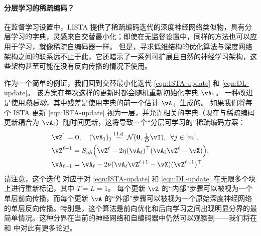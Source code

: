 \documentclass[../../book-main_zh.tex]{subfiles}
\begin{document}
\paragraph{分层学习的稀疏编码？}



在监督学习设置中，LISTA 提供了稀疏编码迭代的深度神经网络类似物，具有分层学习的字典，灵感来自交替最小化；即使在无监督设置中，同样的方法也可以应用于学习，就像稀疏自编码器一样。
但是，寻求低维结构的优化算法与深度网络架构之间的联系远不止于此，它还暗示了一系列可扩展且自然的神经学习架构，这些架构甚至可能在没有反向传播的情况下使用。

作为一个简单的例证，我们回到交替最小化迭代 \eqref{eqn:ISTA-update} 和 \eqref{eqn:DL-update}。
该方案在每次这样的更新时都会随机重新初始化字典 $\vA_1$。
一种改进是使用\textit{热启动}，其中残差是使用字典的前一个估计 $\vA_+$ 生成的。
如果我们将每个 ISTA 更新 \eqref{eqn:ISTA-update} 视为一层，并允许相关的字典（现在与稀疏编码更新耦合为 $\vA_\ell$）随时间更新，这将导致一个“分层可学习的”稀疏编码方案：
\begin{align}
    & \vZ^{1}
     = \Zero, \quad (\vA_{1})_j
     \simiid \dNorm(\vzero, \tfrac{1}{D}\vI), \enspace \forall j \in [m], \\ 
    & \vZ^{\ell + 1} = S_{\eta\lambda}\rp{\vZ^{\ell}
    - 2\eta(\vA_{\ell})^\top(\vA_{\ell}\vZ^{\ell}
    - \vX)},\label{eq:ISTA-update-layerwise}\\ 
    & \vA_{\ell + 1} = \vA_{\ell}- 2\nu (\vA_{\ell}\vZ^{\ell + 1}
    - \vX)(\vZ^{\ell + 1})^\top.
\end{align}
请注意，这个迭代 %
对应于对 \eqref{eqn:ISTA-update} 和 \eqref{eqn:DL-update} 在无限多个块上进行重新标记，其中 $T = L = 1$。
每个更新 $\vZ$ 的“内部”步骤可以被视为一个单层前向传播，而每个更新 $\vA$ 的“外部”步骤可以被视为一个原始深度神经网络的单层反向传播。特别是，这个算法是前向优化和后向学习之间出现明显分界的最简单情况。这种分界在当前的神经网络和自编码器中仍然可以观察到——我们将在  和  中对此有更多论述。
\end{document}
